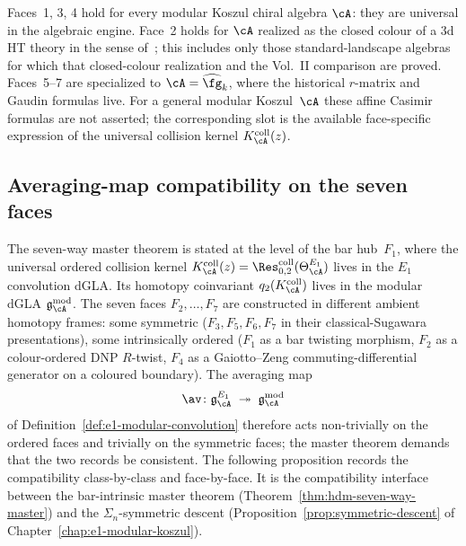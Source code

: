 \begin{remark}
\label{rem:hdm-master-scope}
Faces~1, 3, 4 hold for every modular Koszul chiral algebra $\cA$:
they are universal in the algebraic engine. Face~2 holds for
$\cA$ realized as the closed colour of a 3d HT theory in the sense
of~\cite{DNP25}; this includes only those standard-landscape algebras
for which that closed-colour realization and the Vol.~II comparison
are proved. Faces~5--7 are specialized to
$\cA = \widehat{\fg}_k$, where the historical $r$-matrix and Gaudin
formulas live. For a general modular Koszul~$\cA$ these affine
Casimir formulas are not asserted; the corresponding slot is the
available face-specific expression of the universal collision kernel
$K_\cA^{\mathrm{coll}}(z)$.
\end{remark}

\subsection{Averaging-map compatibility on the seven faces}
\label{subsec:hdm-averaging-compatibility}

The seven-way master theorem is stated at the level of the bar
hub~$F_1$, where the universal ordered collision kernel
$K_\cA^{\mathrm{coll}}(z)=
\Res^{\mathrm{coll}}_{0,2}(\Theta_\cA^{E_1})$ lives in the
$E_1$ convolution dGLA.  Its homotopy coinvariant
$q_2(K_\cA^{\mathrm{coll}})$ lives in the modular dGLA
$\mathfrak{g}_\cA^{\mathrm{mod}}$. The
seven faces $F_2, \dots, F_7$ are constructed in different ambient
homotopy frames: some symmetric ($F_3, F_5, F_6, F_7$ in their
classical-Sugawara presentations), some intrinsically ordered
($F_1$ as a bar twisting morphism, $F_2$ as a colour-ordered
DNP $R$-twist, $F_4$ as a Gaiotto--Zeng commuting-differential
generator on a coloured boundary). The averaging map
\[
 \av\colon \mathfrak{g}_\cA^{E_1} \;\twoheadrightarrow\;
 \mathfrak{g}_\cA^{\mathrm{mod}}
\]
of Definition~\ref{def:e1-modular-convolution} therefore acts
non-trivially on the ordered faces and trivially on the symmetric
faces; the master theorem demands that the two records be
consistent. The following proposition records the compatibility
class-by-class and face-by-face. It is the compatibility interface between
the bar-intrinsic master theorem
(Theorem~\ref{thm:hdm-seven-way-master}) and the
$\Sigma_n$-symmetric descent
(Proposition~\ref{prop:symmetric-descent} of
Chapter~\ref{chap:e1-modular-koszul}).

